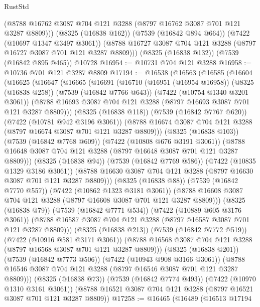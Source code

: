 \begin{lexlean}{RustStd}
\begin{coremodule}
        (@8788 @16762 @3087 @704 @121 @3288 (@8797 @16762 @3087 @701 @121 @3287 @8809)))
      (@8325 (@16838 @162))
      (@7539 (@16842 @894 @664))
      (@7422 (@10697 @1347 @3497 @3061))
      (@8788 @16727 @3087 @704 @121 @3288 (@8797 @16727 @3087 @701 @121 @3287 @8809)))
    (@8325 (@16838 @132))
    (@7539 (@16842 @895 @465))
    @10728
@16954 := @10731 @704 @121 @3288
@16958 := @10736 @701 @121 @3287 @8809
@17194 := @16538
    (@16563
      (@16585
        (@16604
          (@16625
            (@16647
              (@16665
                (@16691
                  (@16710
                    (@16951 (@16954 @16958))
                    (@8325 (@16838 @258))
                    (@7539 (@16842 @7766 @643))
                    (@7422 (@10754 @1340 @3201 @3061))
                    (@8788 @16693 @3087 @704 @121 @3288 (@8797 @16693 @3087 @701 @121 @3287 @8809)))
                  (@8325 (@16838 @118))
                  (@7539 (@16842 @7767 @620))
                  (@7422 (@10781 @942 @3196 @3061))
                  (@8788 @16674 @3087 @704 @121 @3288 (@8797 @16674 @3087 @701 @121 @3287 @8809)))
                (@8325 (@16838 @103))
                (@7539 (@16842 @7768 @609))
                (@7422 (@10808 @676 @3191 @3061))
                (@8788 @16648 @3087 @704 @121 @3288 (@8797 @16648 @3087 @701 @121 @3287 @8809)))
              (@8325 (@16838 @94))
              (@7539 (@16842 @7769 @586))
              (@7422 (@10835 @1329 @3186 @3061))
              (@8788 @16630 @3087 @704 @121 @3288 (@8797 @16630 @3087 @701 @121 @3287 @8809)))
            (@8325 (@16838 @88))
            (@7539 (@16842 @7770 @557))
            (@7422 (@10862 @1323 @3181 @3061))
            (@8788 @16608 @3087 @704 @121 @3288 (@8797 @16608 @3087 @701 @121 @3287 @8809)))
          (@8325 (@16838 @79))
          (@7539 (@16842 @7771 @534))
          (@7422 (@10889 @605 @3176 @3061))
          (@8788 @16587 @3087 @704 @121 @3288 (@8797 @16587 @3087 @701 @121 @3287 @8809)))
        (@8325 (@16838 @213))
        (@7539 (@16842 @7772 @519))
        (@7422 (@10916 @581 @3171 @3061))
        (@8788 @16568 @3087 @704 @121 @3288 (@8797 @16568 @3087 @701 @121 @3287 @8809)))
      (@8325 (@16838 @201))
      (@7539 (@16842 @7773 @506))
      (@7422 (@10943 @908 @3166 @3061))
      (@8788 @16546 @3087 @704 @121 @3288 (@8797 @16546 @3087 @701 @121 @3287 @8809)))
    (@8325 (@16838 @73))
    (@7539 (@16842 @7774 @493))
    (@7422 (@10970 @1310 @3161 @3061))
    (@8788 @16521 @3087 @704 @121 @3288 (@8797 @16521 @3087 @701 @121 @3287 @8809))
@17258 := @16465
    (@16489
      (@16513
        @17194

\end{coremodule}
\end{lexlean}
